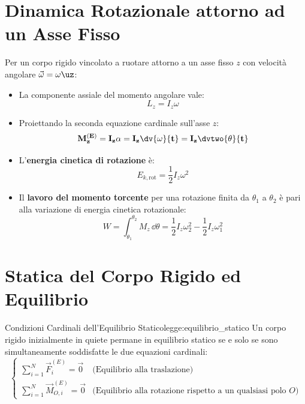 \section{Dinamica Rotazionale attorno ad un Asse Fisso}
\label{sec:dinamica_rotazionale}

Per un corpo rigido vincolato a ruotare attorno a un asse fisso $z$ con velocità angolare $\vec{\omega} = \omega\uz$:
\begin{itemize}
    \item La componente assiale del momento angolare vale:
    \begin{equation}
        L_z = I_z \omega
    \end{equation}
    \item Proiettando la seconda equazione cardinale sull'asse $z$:
    \begin{equation}
        \mathbf{M_z^{(E)} = I_z \alpha = I_z \dv{\omega}{t} = I_z \dvtwo{\theta}{t}}
        \label{eq:seconda_cardinale_rotazione}
    \end{equation}
    \item L'\textbf{energia cinetica di rotazione} è:
    \begin{equation}
        E_{k,\text{rot}} = \frac{1}{2}I_z \omega^2
    \end{equation}
    \item Il \textbf{lavoro del momento torcente} per una rotazione finita da $\theta_1$ a $\theta_2$ è pari alla variazione di energia cinetica rotazionale:
    \begin{equation}
        W = \int_{\theta_1}^{\theta_2} M_z\,\dd\theta = \frac{1}{2}I_z \omega_2^2 - \frac{1}{2}I_z \omega_1^2
    \end{equation}
\end{itemize}

\section{Statica del Corpo Rigido ed Equilibrio}
\label{sec:statica_corpo_rigido}

\begin{legge}{Condizioni Cardinali dell'Equilibrio Statico}{legge:equilibrio_statico}
Un corpo rigido inizialmente in quiete permane in equilibrio statico se e solo se sono simultaneamente soddisfatte le due equazioni cardinali:
\begin{equation}
    \begin{cases}
        \sum_{i=1}^N \vec{F}_i^{(E)} = \vec{0} & \text{(Equilibrio alla traslazione)} \\[1ex]
        \sum_{i=1}^N \vec{M}_{O,i}^{(E)} = \vec{0} & \text{(Equilibrio alla rotazione rispetto a un qualsiasi polo } O\text{)}
    \end{cases}
    \label{eq:condizioni_statica}
\end{equation}
\end{legge}

